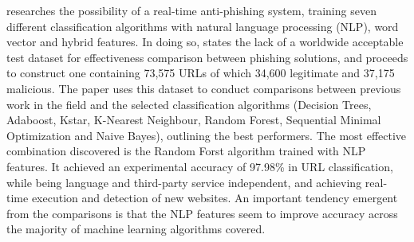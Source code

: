 \cite{ML_BASED_DETECTION_FROM_URL} researches the possibility of a real-time
anti-phishing system, training seven different classification algorithms with
natural language processing (NLP), word vector and hybrid features. In doing so,
\cite{ML_BASED_DETECTION_FROM_URL} states the lack of a worldwide acceptable
test dataset for effectiveness comparison between phishing solutions, and
proceeds to construct one containing 73,575 URLs of which 34,600 legitimate and
37,175 malicious. The paper uses this dataset to conduct comparisons between
previous work in the field and the selected classification algorithms (Decision
Trees, Adaboost, Kstar, K-Nearest Neighbour, Random Forest, Sequential Minimal
Optimization and Naive Bayes), outlining the best performers. The most effective
combination discovered is the Random Forst algorithm trained with NLP features.
It achieved an experimental accuracy of 97.98\% in URL classification, while
being language and third-party service independent, and achieving real-time
execution and detection of new websites. An important tendency emergent from the
comparisons is that the NLP features seem to improve accuracy across the
majority of machine learning algorithms covered.

